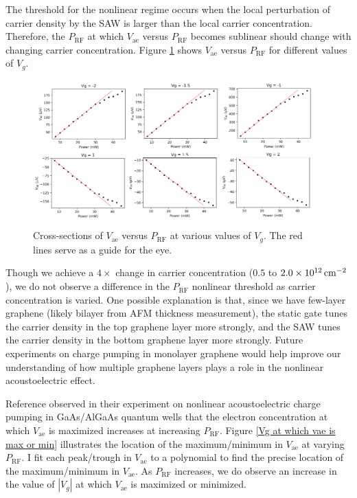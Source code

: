 \documentclass[double,12pt,1in,seploa]{beavtex}
\begin{document}
The threshold for the nonlinear regime occurs when the local perturbation of carrier density by the SAW is larger than the local carrier concentration. Therefore, the $P_{\mathrm{RF}}$ at which $V_{\mathrm{ae}}$ versus $P_{\mathrm{RF}}$ becomes sublinear should change with changing carrier concentration. Figure \ref{vae vs prf at different vg} shows $V_{\mathrm{ae}}$ versus $P_{\mathrm{RF}}$ for different values of $V_g$. 
\begin{figure}
    \includegraphics[width = 1\textwidth]{vae prf nonlinear at different vg.pdf}
    \caption{Cross-sections of $V_{\mathrm{ae}}$ versus $P_{\mathrm{RF}}$ at various values of $V_g$. The red lines serve as a guide for the eye.}
    \label{vae vs prf at different vg}
\end{figure}
Though we achieve a $4\times$ change in carrier concentration ($0.5$ to $\SI{2.0E12}{\centi\meter^{-2}}$), we do not observe a difference in the $P_{\mathrm{RF}}$ nonlinear threshold as carrier concentration is varied. One possible explanation is that, since we have few-layer graphene (likely bilayer from AFM thickness measurement), the static gate tunes the carrier density in the top graphene layer more strongly, and the SAW tunes the carrier density in the bottom graphene layer more strongly. Future experiments on charge pumping in monolayer graphene would help improve our understanding of how multiple graphene layers plays a role in the nonlinear acoustoelectric effect.

Reference \cite{rotter_nonlinear_1999} observed in their experiment on nonlinear acoustoelectric charge pumping in GaAs/AlGaAs quantum wells that the electron concentration at which $V_{\mathrm{ae}}$ is maximized increases at increasing $P_{\mathrm{RF}}$. Figure \ref{Vg at which vae is max or min} illustrates the location of the maximum/minimum in $V_{\mathrm{ae}}$ at varying $P_{\mathrm{RF}}$. I fit each peak/trough in $V_{\mathrm{ae}}$ to a polynomial to find the precise location of the maximum/minimum in $V_{\mathrm{ae}}$. As $P_{\mathrm{RF}}$ increases, we do observe an increase in the value of $|V_g|$ at which $V_{\mathrm{ae}}$ is maximized or minimized.
\end{document}
